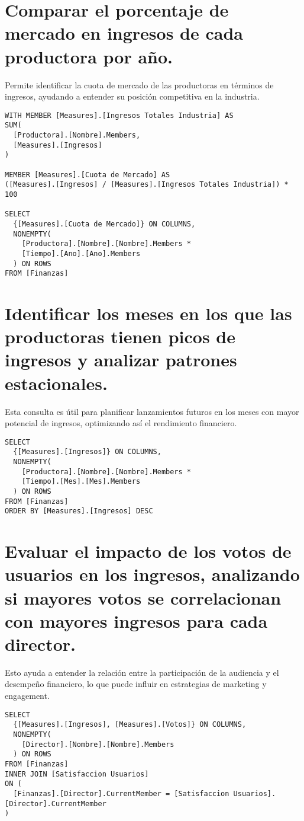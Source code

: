 \documentclass[11pt]{opticajnl}
\begin{document}
\section{Comparar el porcentaje de mercado en ingresos de cada productora por año.}

Permite identificar la cuota de mercado de las productoras en términos de ingresos, ayudando a entender su posición competitiva en la industria.


\begin{lstlisting}[style=terminal]
WITH MEMBER [Measures].[Ingresos Totales Industria] AS
SUM(
  [Productora].[Nombre].Members, 
  [Measures].[Ingresos]
)

MEMBER [Measures].[Cuota de Mercado] AS
([Measures].[Ingresos] / [Measures].[Ingresos Totales Industria]) * 100

SELECT 
  {[Measures].[Cuota de Mercado]} ON COLUMNS,
  NONEMPTY(
    [Productora].[Nombre].[Nombre].Members *
    [Tiempo].[Ano].[Ano].Members
  ) ON ROWS
FROM [Finanzas]
\end{lstlisting}



\section{Identificar los meses en los que las productoras tienen picos de ingresos y analizar patrones estacionales.}

Esta consulta es útil para planificar lanzamientos futuros en los meses con mayor potencial de ingresos, optimizando así el rendimiento financiero.


\begin{lstlisting}[style=terminal] 
SELECT 
  {[Measures].[Ingresos]} ON COLUMNS,
  NONEMPTY(
    [Productora].[Nombre].[Nombre].Members *
    [Tiempo].[Mes].[Mes].Members
  ) ON ROWS
FROM [Finanzas]
ORDER BY [Measures].[Ingresos] DESC
\end{lstlisting}


\section{Evaluar el impacto de los votos de usuarios en los ingresos, analizando si mayores votos se correlacionan con mayores ingresos para cada director.}

Esto ayuda a entender la relación entre la participación de la audiencia y el desempeño financiero, lo que puede influir en estrategias de marketing y engagement.


\begin{lstlisting}[style=terminal]
SELECT 
  {[Measures].[Ingresos], [Measures].[Votos]} ON COLUMNS,
  NONEMPTY(
    [Director].[Nombre].[Nombre].Members
  ) ON ROWS
FROM [Finanzas]
INNER JOIN [Satisfaccion Usuarios]
ON (
  [Finanzas].[Director].CurrentMember = [Satisfaccion Usuarios].[Director].CurrentMember
)
\end{lstlisting}
\end{document}
